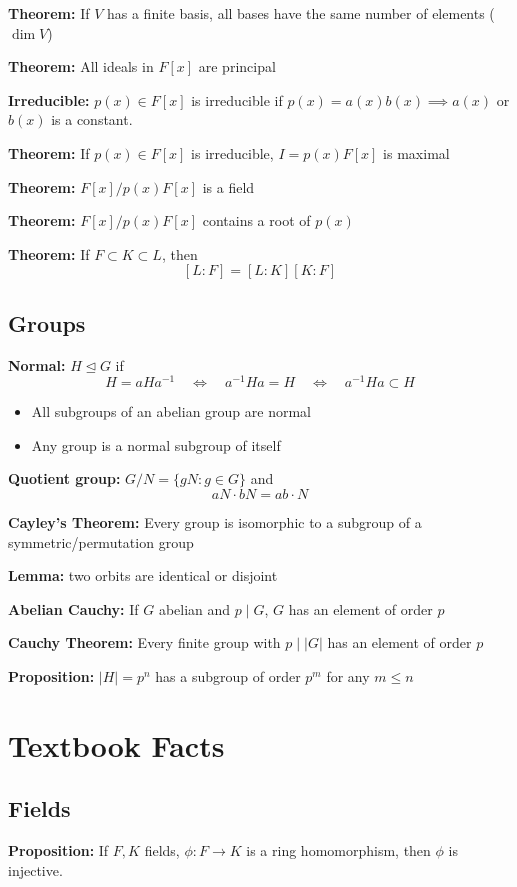 \documentclass[11pt]{article}
\newcommand{\abs}[1]{\left\vert #1 \right\vert}
\begin{document}
\begin{multicols}{2}
        \textbf{Theorem:} If $V$ has a finite basis, all bases have the same number of elements ($\dim V$)

        \textbf{Theorem:} All ideals in $F[x]$ are principal 

        \textbf{Irreducible:} $p(x) \in F[x]$ is irreducible if $p(x) = a(x)b(x) \implies a(x)$ or $b(x)$ is a constant. 

        \textbf{Theorem:} If $p(x)\in F[x]$ is irreducible, $I = p(x)F[x]$ is maximal 

        \textbf{Theorem:} $F[x]/p(x)F[x]$ is a field 

        \textbf{Theorem:} $F[x]/p(x)F[x]$ contains a root of $p(x)$

        \textbf{Theorem:} If $F \subset K \subset L$, then 
        \[[L:F]= [L:K][K:F]\]

    \subsection*{Groups}
        \textbf{Normal:} $H \trianglelefteq G$ if 
        \[H = aHa^{-1} \quad \iff \quad a^{-1}Ha = H \quad \iff \quad a^{-1}Ha \subset H\]
        \begin{itemize}
            \item All subgroups of an abelian group are normal 
            \item Any group is a normal subgroup of itself
        \end{itemize}

        \textbf{Quotient group:} $G/N = \{gN: g \in G\}$ and 
        \[aN \cdot bN = ab\cdot N\]

        \textbf{Cayley's Theorem:} Every group is isomorphic to a subgroup of a symmetric/permutation group

        \textbf{Lemma:} two orbits are identical or disjoint 

        \textbf{Abelian Cauchy:} If $G$ abelian and $p \mid G$, $G$ has an element of order $p$ 

        \textbf{Cauchy Theorem:} Every finite group with $p \mid \abs{G}$ has an element of order $p$

        \textbf{Proposition:} $\abs{H} = p^n$ has a subgroup of order $p^m$ for any $m \leq n$

\section*{Textbook Facts}
    \subsection*{Fields}
        \textbf{Proposition:} If $F, K$ fields, $\phi: F\to K$ is a ring homomorphism, then $\phi$ is injective.


\end{multicols}
\end{document}
